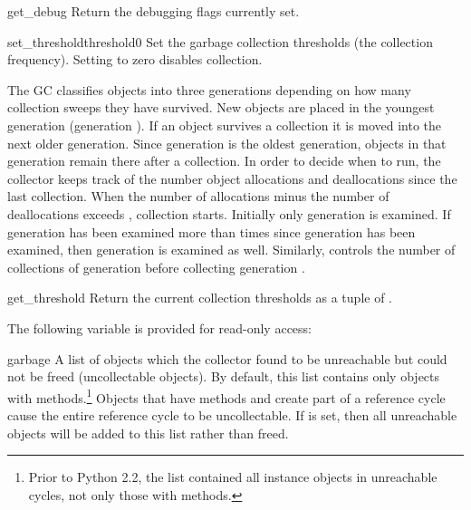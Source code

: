 \begin{funcdesc}{get_debug}{}
Return the debugging flags currently set.
\end{funcdesc}

\begin{funcdesc}{set_threshold}{threshold0}
Set the garbage collection thresholds (the collection frequency).
Setting  to zero disables collection.

The GC classifies objects into three generations depending on how many
collection sweeps they have survived.  New objects are placed in the
youngest generation (generation ).  If an object survives a
collection it is moved into the next older generation.  Since
generation  is the oldest generation, objects in that
generation remain there after a collection.  In order to decide when
to run, the collector keeps track of the number object allocations and
deallocations since the last collection.  When the number of
allocations minus the number of deallocations exceeds
, collection starts.  Initially only generation
 is examined.  If generation  has been examined more
than  times since generation  has been
examined, then generation  is examined as well.  Similarly,
 controls the number of collections of generation
 before collecting generation .
\end{funcdesc}

\begin{funcdesc}{get_threshold}{}
Return the current collection thresholds as a tuple of
.
\end{funcdesc}


The following variable is provided for read-only access:

\begin{datadesc}{garbage}
A list of objects which the collector found to be unreachable
but could not be freed (uncollectable objects).  By default, this list
contains only objects with  methods.\footnote{Prior to
  Python 2.2, the list contained all instance objects in unreachable
  cycles,  not only those with  methods.}
Objects that have
 methods and create part of a reference cycle cause
the entire reference cycle to be uncollectable.  If
 is set, then all unreachable objects will
be added to this list rather than freed.
\end{datadesc}


